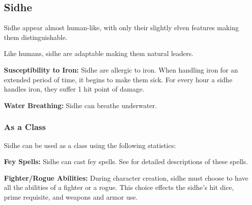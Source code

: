 \begin{multicols*}{2}
\subsection{Sidhe}

Sidhe appear almost human-like, with only their slightly elven features making them distinguishable.

Like humans, sidhe are adaptable making them natural leaders.

\textbf{Susceptibility to Iron:} Sidhe are allergic to iron. When handling iron for an extended period of time, it begins to make them sick. For every hour a sidhe handles iron, they suffer 1 hit point of damage.

\textbf{Water Breathing:} Sidhe can breathe underwater.

\subsubsection{As a Class}
Sidhe can be used as a class using the following statistics:

\textbf{Fey Spells:} Sidhe can cast fey spells. See  for detailed descriptions of these spells.

\textbf{Fighter/Rogue Abilities:} During character creation, sidhe must choose to have all the abilities of a fighter or a rogue. This choice effects the sidhe's hit dice, prime requisite, and weapons and armor use.

\end{multicols*}
